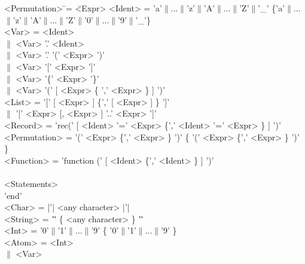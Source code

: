 \newpage
\begin{tabbing}
<Permutation>  \=\:= \= <Expr>                                      \kill
<Ident>        \>\:=  \>'a'$\|$...$\|$'z'$\|$'A'$\|$...$\|$'Z'$\|$'\_'
\{'a'$\|$...$\|$'z'$\|$'A'$\|$...$\|$'Z'$\|$'0'$\|$...$\|$'9'$\|$'\_'\}\\
<Var>          \>\:=  \><Ident>                                        \\
               \>$\|$ \><Var> '.' <Ident>                              \\
               \>$\|$ \><Var> '.' '(' <Expr> ')'                       \\
               \>$\|$ \><Var> '[' <Expr> ']'                           \\
               \>$\|$ \><Var> '\{' <Expr> '\}'                         \\
               \>$\|$ \><Var> '(' [ <Expr> \{ ',' <Expr> \} ] ')'      \\
<List>         \>\:=  \>'[' [ <Expr> ] \{',' [ <Expr> ] \} ']'         \\
               \>$\|$ \>'[' <Expr> [, <Expr> ] '..' <Expr> ']'         \\
<Record>       \>\:=  \>'rec(' [ <Ident> '\:=' <Expr>
                           \{',' <Ident> '\:=' <Expr> \} ] ')'         \\
<Permutation>  \>\:=  \>'(' <Expr> \{',' <Expr> \} ')'
                     \{ '(' <Expr> \{',' <Expr> \} ')' \}              \\
<Function>     \>\:=  \>'function (' [ <Ident> \{',' <Ident> \} ] ')'  \\
               \>       \\
               \>     \>    <Statements>                               \\
               \>     \>'end'                                          \\
<Char>         \>\:=  \>|'| <any character> |'|                        \\
<String>       \>\:=  \>'\"' \{ <any character> \} '\"'                \\
<Int>          \>\:=  \>'0'$\|$'1'$\|$...$\|$'9'
                     \{ '0'$\|$'1'$\|$...$\|$'9' \}                    \\
<Atom>         \>\:=  \><Int>                                          \\
               \>$\|$ \><Var>                                          \\

\end{tabbing}
